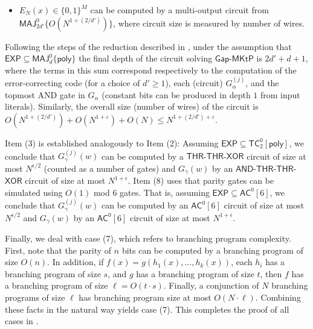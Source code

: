 \documentclass{toc}
\newcommand{\gapmktp}{\mathsf{Gap}$-$\mathsf{MKtP}}
\begin{document}
\begin{theorem}
\begin{itemize}
\item $E_N(x) \in \{0,1\}^M$ can be computed by a multi-output circuit from $\mathsf{MAJ}^0_{2d'}\{O(N^{1 + (2/d')})\}$, where circuit size is measured by number of wires.
\end{itemize}
\end{theorem}

\vspace{0.2cm}

 Following the steps of the reduction described in , under the assumption that $\mathsf{EXP} \subseteq \mathsf{MAJ}^0_d\{\mathsf{poly}\}$ the final depth of the circuit solving $\gapmktp$ is $2d' + d + 1$, where the terms in this sum correspond respectively to the computation of the error-correcting code (for a choice of $d'\geq 1$), each (circuit) $G^{(j)}_\alpha$, and the topmost AND gate in $G_\alpha$ (constant bits can be produced in depth $1$ from input literals). Similarly, the overall size (number of wires) of the circuit is $O(N^{1 + (2/d')}) + O(N^{1 + \varepsilon}) + O(N) \leq N^{1 + (2/d') + \varepsilon}$.

Item (3) is established analogously to Item (2): Assuming $\mathsf{EXP} \subseteq \mathsf{TC}^0_2[\mathsf{poly}]$, we conclude that $G^{(j)}_{\gamma}(w)$ can be computed by a  $\mathsf{THR}$-$\mathsf{THR}$-$\mathsf{XOR}$ circuit of size at most $N^{\epsilon/2}$ (counted as a number of gates) and $G_{\gamma}(w)$ by an $\mathsf{AND}$-$\mathsf{THR}$-$\mathsf{THR}$-$\mathsf{XOR}$ circuit of size at most $N^{1 + \epsilon}$. Item (8) uses that parity gates can be simulated using $O(1)$ mod $6$ gates. That is, assuming $\mathsf{EXP} \subseteq \mathsf{AC}^0[6]$, we conclude that $G^{(j)}_{\gamma}(w)$ can be computed by an $\mathsf{AC}^0[6]$ circuit of size at most $N^{\epsilon/2}$ and $G_{\gamma}(w)$ by an $\mathsf{AC}^0[6]$ circuit of size at most $N^{1 + \epsilon}$.

Finally, we deal with case (7), which refers to branching program complexity.  First, note that the parity of $n$ bits can be computed by a branching program of size $O(n)$. In addition, if $f(x) = g(h_1(x), \ldots, h_k(x))$, each $h_i$ has a branching program of size $s$, and $g$ has a branching program of size $t$, then $f$ has a branching program of size $\ell = O(t \cdot s)$. Finally, a conjunction of $N$ branching programs of size $\ell$ has branching program size at most $O(N \cdot \ell)$. Combining these facts in the natural way yields case (7). This completes the proof of all cases in .
\end{document}
